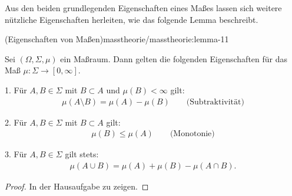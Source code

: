 \par
Aus den beiden grundlegenden Eigenschaften eines Maßes lassen sich weitere nützliche Eigenschaften herleiten, wie das folgende Lemma beschreibt.
\begin{lemma}{(Eigenschaften von Maßen)}{masstheorie/masstheorie:lemma-11}



\par
Sei \((\Omega, \Sigma, \mu)\) ein Maßraum.
Dann gelten die folgenden Eigenschaften für das Maß \(\mu \colon \Sigma \rightarrow [0,\infty]\).

\par
1. Für \(A,B \in \Sigma\) mit \(B \subset A\) und \(\mu(B) < \infty\) gilt:
\begin{align*}
\mu(A \setminus B) = \mu(A) - \mu(B) \qquad \text{(Subtraktivität)}
\end{align*}
\par
2. Für \(A,B \in \Sigma\) mit \(B \subset A\) gilt:
\begin{align*}
\mu(B) \leq \mu(A) \qquad \text{(Monotonie)}
\end{align*}
\par
3. Für \(A,B \in \Sigma\) gilt stets:
\begin{align*}
\mu(A \cup B) = \mu(A) + \mu(B) - \mu(A \cap B).
\end{align*}\end{lemma}

\begin{proof}
 In der Hausaufgabe zu zeigen.
\end{proof}

